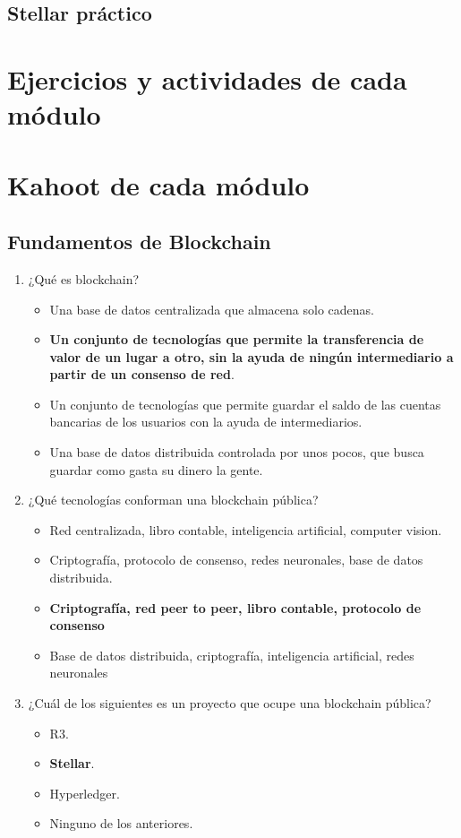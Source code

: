 \documentclass[a4paper,12pt]{/home/armando/Documentos/Cursos/LaTeX/Plantillas/lib/pub}
\begin{document}
	\subsection{Stellar práctico}
	
\section{Ejercicios y actividades de cada módulo}

\section{Kahoot de cada módulo}
	\subsection{Fundamentos de Blockchain}
	\begin{enumerate}
		\item ¿Qué es blockchain?
		\begin{itemize}
			\item Una base de datos centralizada que almacena solo cadenas.
			\item \textbf{Un conjunto de tecnologías que permite la transferencia de valor de un lugar a otro, sin la ayuda de ningún intermediario a partir de un consenso de red}.
			\item Un conjunto de tecnologías que permite guardar el saldo de las cuentas bancarias de los usuarios con la ayuda de intermediarios.
			\item Una base de datos distribuida controlada por unos pocos, que busca guardar como gasta su dinero la gente.
		\end{itemize}
	\item ¿Qué tecnologías conforman una blockchain pública?
	\begin{itemize}
		\item Red centralizada, libro contable, inteligencia artificial, computer vision.
		\item Criptografía, protocolo de consenso,  redes neuronales, base de datos distribuida.
		\item \textbf{Criptografía, red peer to peer, libro contable, protocolo de consenso}
		\item Base de datos distribuida, criptografía, inteligencia artificial, redes neuronales
	\end{itemize}
	\item ¿Cuál de los siguientes  es un proyecto que ocupe una blockchain pública?
	\begin{itemize}
		\item R3.
		\item \textbf{Stellar}.
		\item Hyperledger.
		\item Ninguno de los anteriores.
	\end{itemize}
	\end{enumerate}
\end{document}
